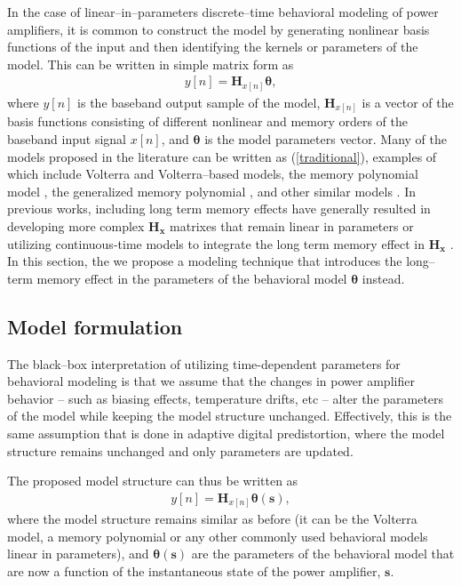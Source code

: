\documentclass[journal]{IEEEtran}
\begin{document}
In the case of linear--in--parameters discrete--time behavioral modeling of power amplifiers, it is common to construct the model by generating nonlinear basis functions of the input and then identifying the kernels or parameters of the model. This can be written in simple matrix form as
\begin{align}
y[n] = \mathbf{H}_{x[n]}\boldsymbol{\theta},
\label{traditional}
\end{align}
where $y[n]$ is the baseband output sample of the model, $\mathbf{H}_{x[n]}$ is a vector of the basis functions consisting of different nonlinear and memory orders of the baseband input signal $x[n]$, and $\bm{\theta}$ is the model parameters vector. Many of the models proposed in the literature can be written as (\ref{traditional}), examples of which include Volterra and Volterra--based models, the memory polynomial model \cite{kim}, the generalized memory polynomial \cite{morgan}, and other similar models \cite{pedro}. In previous works, including long term memory effects have generally resulted in developing more complex $\mathbf{H_{x}}$ matrixes that remain linear in parameters \cite{crespo2010} or utilizing continuous-time models to integrate the long term memory effect in $\mathbf{H_{x}}$ \cite{ngoya}. In this section, the we propose a modeling technique that introduces the long--term memory effect in the parameters of the behavioral model $\bm{\theta}$ instead.

\subsection{Model formulation}
The black--box interpretation of utilizing time-dependent parameters for behavioral modeling is that we assume that the changes in power amplifier behavior -- such as biasing effects, temperature drifts, etc -- alter the parameters of the model while keeping the model structure unchanged. Effectively, this is the same assumption that is done in adaptive digital predistortion, where the model structure remains unchanged and only parameters are updated.

The proposed model structure can thus be written as
\begin{align}
y[n] = \mathbf{H}_{x[n]}\bm{\theta}\mathbf{(s)},
\label{ordinary}
\end{align}
where the model structure remains similar as before (it can be the Volterra model, a memory polynomial or any other commonly used behavioral models linear in parameters), and $\bm{\theta}\mathbf{(s)}$ are the parameters of the behavioral model that are now a function of the instantaneous state of the power amplifier, $\mathbf{s}$.
\end{document}
